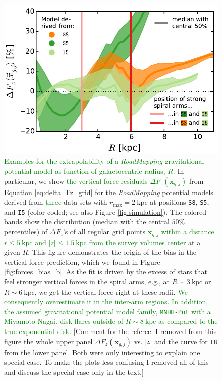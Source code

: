 \documentclass[iop,revtex4,numberedappendix,appendixfloats]{emulateapj}
\newcommand{\vect}[1]{\boldsymbol{#1}}
\newcommand{\RM}{{\sl RoadMapping}}
\newcommand{\NEW}[1]{\textcolor{Green}{#1}}
\newcommand{\OLD}[1]{}
\newcommand{\COMMENT}[1]{\textcolor{ProcessBlue}{#1}}
\begin{document}
\begin{figure}[!htbp]
\centering
    \includegraphics[width=\columnwidth]{fig/MNdHHdiffSph2_Fg_vs_R_2.pdf}
\caption{\OLD{\RM{}'s ability to predict the vertical gravitational force as a function of the height above the plane, $|z|$, and galactocentric radius, $R$.}\NEW{Examples for the extrapolability of a \RM{} gravitational potential model as function of galactocentric radius, $R$.} In particular, we show \OLD{the predictive power, calculated}\NEW{the vertical force residuals $\Delta F_z(\vect{x}_{g,j})$} from Equation \eqref{eq:delta_Fz_grid}\OLD{,} for the \RM{} potential models derived from \OLD{the four}\NEW{three} data sets with $r_\text{max}=2~\text{kpc}$ at positions \texttt{S8}, \OLD{\texttt{I8},} \texttt{S5}, and \texttt{I5} (color-coded; see also Figure \ref{fig:simulation}). The colored bands show the distribution (median with the central $50\%$ percentiles) of $\Delta F_z$'s of all regular grid points \OLD{$g_j$}\NEW{$\vect{x}_{g,j}$} \NEW{within a distance $r\leq5~\text{kpc}$ and $|z|\leq1.5~\text{kpc}$ from the survey volumes center} at a given \OLD{$|z|$ or} $R$. This figure demonstrates the origin of the \OLD{strong} bias in the vertical force prediction, which we found in Figure \ref{fig:forces_bias_b}. As the fit is driven by the excess of stars that feel stronger vertical forces in the spiral arms, e.g., at $R\sim3~\text{kpc}$ or $R\sim6~\text{kpc}$, we get the vertical force right at these radii\OLD{ in the plane of the disk}. \NEW{We consequently overestimate it in the inter-arm regions. In addition, the assumed gravitational potential model family, \texttt{MNHH-Pot} with a Miyamoto-Nagai, disk flares outside of $R\sim8~\text{kpc}$ as compared to the true exponential disk.}\OLD{We consequently overestimate it in the smooth outer regions of the galaxy and at large heights above the plane, where the spiral arms don't play a role.} \OLD{(The potential model with $r_\text{max}=2~\text{kpc}$ at \texttt{I8}, light orange, is a special case that was discussed in Section \ref{sec:parameter recovery}.)} \COMMENT{[Comment for the referee: I removed from this figure the whole upper panel $\Delta F_z(\vect{x}_{g,j})$ vs. $|z|$ and the curve for \texttt{I8} from the lower panel. Both were only interesting to explain one special case. To make the plots less confusing I removed all of this and discuss the special case only in the text.]}}
\label{fig:Fg_vs_R}
\end{figure}
\end{document}
